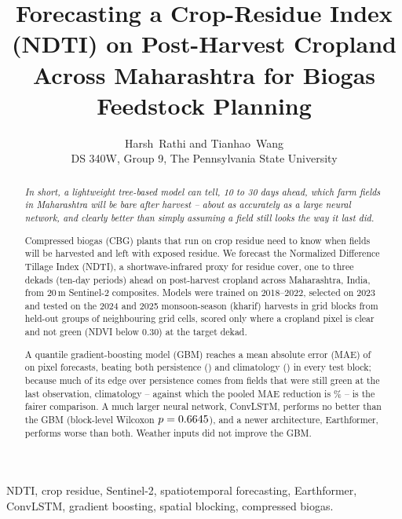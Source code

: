 \documentclass[journal]{IEEEtran}
\begin{document}
\raggedbottom
\title{Forecasting a Crop-Residue Index (NDTI) on Post-Harvest Cropland Across Maharashtra for Biogas Feedstock Planning}
\author{Harsh~Rathi and Tianhao~Wang\\
\small DS 340W, Group 9, The Pennsylvania State University}
\maketitle

\begin{abstract}
\textit{In short, a lightweight tree-based model can tell, 10 to 30 days ahead, which farm fields in Maharashtra will be bare after harvest -- about as accurately as a large neural network, and clearly better than simply assuming a field still looks the way it last did.}

Compressed biogas (CBG) plants that run on crop residue need to know when fields will be harvested and left with exposed residue. We forecast the Normalized Difference Tillage Index (NDTI), a shortwave-infrared proxy for residue cover, one to three dekads (ten-day periods) ahead on post-harvest cropland across Maharashtra, India, from 20\,m Sentinel-2 composites. Models were trained on 2018--2022, selected on 2023 and tested on the 2024 and 2025 monsoon-season (kharif) harvests in \finNTestBlocks{} grid blocks from held-out groups of neighbouring grid cells, scored only where a cropland pixel is clear and not green (NDVI below 0.30) at the target dekad.

A quantile gradient-boosting model (GBM) reaches a mean absolute error (MAE) of \finGbmMAE{} on \finNPixelForecasts{} pixel forecasts, beating both persistence (\finPersMAE) and climatology (\finClimMAE) in every test block; because much of its edge over persistence comes from fields that were still green at the last observation, climatology -- against which the pooled MAE reduction is \finxGbmRelMAEVsClim\% -- is the fairer comparison. A much larger neural network, ConvLSTM, performs no better than the GBM (block-level Wilcoxon $p=0.6645$), and a newer architecture, Earthformer, performs worse than both. Weather inputs did not improve the GBM.
\end{abstract}

\begin{IEEEkeywords}
NDTI, crop residue, Sentinel-2, spatiotemporal forecasting, Earthformer, ConvLSTM, gradient boosting, spatial blocking, compressed biogas.
\end{IEEEkeywords}
\end{document}
